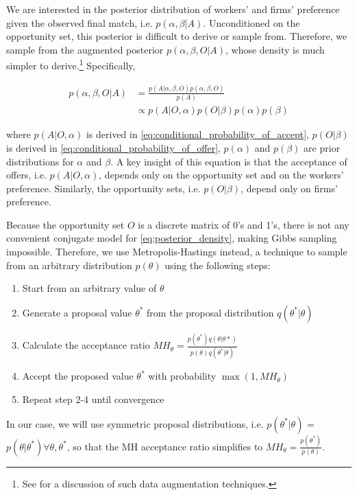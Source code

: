 We are interested in the posterior distribution of workers' and firms'
preference given the observed final match, i.e. $p(\alpha, \beta | A)$.
Unconditioned on the opportunity set, this posterior is difficult to derive or
sample from. Therefore, we sample from the augmented posterior $p(\alpha, \beta,
O | A)$, whose density is much simpler to derive.\footnote{See
  \citet{Tanner1987} for a discussion of such data augmentation techniques.}
Specifically,

\begin{align}
  p(\alpha, \beta, O | A) &= \frac{p(A | \alpha, \beta, O) p(\alpha, \beta, O)}{p(A)} \\
                          &\propto p(A|O, \alpha) p(O|\beta) p(\alpha) p(\beta) 
                            \label{eq:posterior_density}
\end{align}

where $p(A|O, \alpha)$ is derived in
\eqref{eq:conditional_probability_of_accept}, $p(O|\beta)$ is derived in
\eqref{eq:conditional_probability_of_offer}, $p(\alpha)$ and $p(\beta)$ are
prior distributions for $\alpha$ and $\beta$. A key insight of this equation is
that the acceptance of offers, i.e. $p(A|O, \alpha)$, depends only on the
opportunity set and on the workers' preference. Similarly, the opportunity sets,
i.e. $p(O|\beta)$, depend only on firms' preference.

Because the opportunity set $O$ is a discrete matrix of 0's and 1's, there is
not any convenient conjugate model for \eqref{eq:posterior_density}, making
Gibbs sampling impossible. Therefore, we use Metropolis-Hastings instead, a
technique to sample from an arbitrary distribution $p(\theta)$ using the
following steps:

\begin{enumerate}
\item Start from an arbitrary value of $\theta$
\item Generate a proposal value $\theta^*$ from the proposal distribution
  $q(\theta^*|\theta)$
\item Calculate the acceptance ratio $MH_{\theta} =
  \frac{p(\theta^*)q(\theta|\theta*)}{p(\theta)q(\theta^*|\theta)}$
\item Accept the proposed value $\theta^*$ with probability $\max(1,
  MH_{\theta})$
\item Repeat step 2-4 until convergence
\end{enumerate}

In our case, we will use symmetric proposal distributions, i.e.
$p(\theta^*|\theta)$ = $p(\theta | \theta^*) \forall \theta, \theta^*$, so that
the MH acceptance ratio simplifies to $MH_{\theta} =
\frac{p(\theta^*)}{p(\theta)}$.

